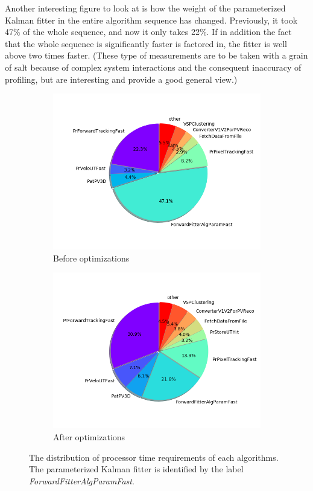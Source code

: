 \documentclass[12pt]{article}
\begin{document}
Another interesting figure to look at is how the weight of the parameterized Kalman fitter in the entire algorithm sequence has changed. Previously, it took 47\% of the whole sequence, and now it only takes 22\%. If in addition the fact that the whole sequence is significantly faster is factored in, the fitter is well above two times faster. \small (These type of measurements are to be taken with a grain of salt because of complex system interactions and the consequent inaccuracy of profiling, but are interesting and provide a good general view.) \normalsize

\begin{figure}[H]
	\centering
	\begin{subfigure}{.5\textwidth}
		\centering
		\includegraphics[width=\linewidth]{algo_usage_original_bestphys}
		\caption{Before optimizations}
	\end{subfigure}%
	\begin{subfigure}{.5\textwidth}
		\centering
		\includegraphics[width=\linewidth]{algo_usage_optkalman_bestphys}
		\caption{After optimizations}
	\end{subfigure}
	\caption{The distribution of processor time requirements of each algorithms. The parameterized Kalman fitter is identified by the label \textit{ForwardFitterAlgParamFast}.}
	\label{fig_kalmanfit_results_algousage}
\end{figure}
\end{document}
